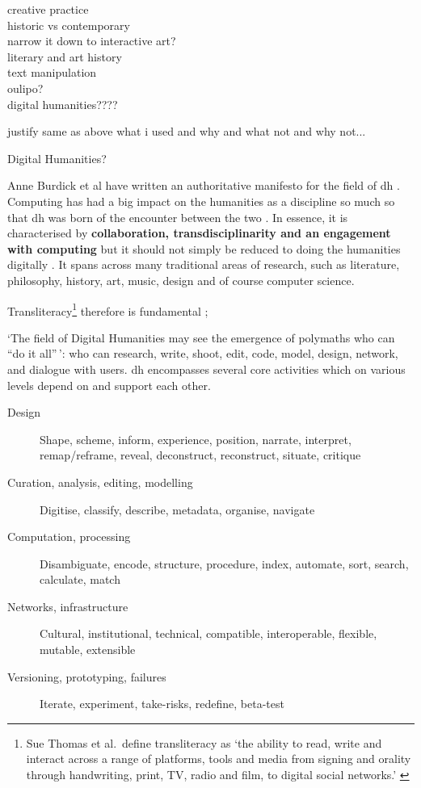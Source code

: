 \begin{draft}
  creative practice\\
  historic vs contemporary\\
  narrow it down to interactive art?\\
  literary and art history\\
  text manipulation\\
  oulipo?\\
  digital humanities????

  justify same as above what i used and why and what not and why not...
\end{draft}

Digital Humanities?

\begin{draft}
  Anne Burdick et al have written an authoritative manifesto for the field of \gls{dh} \citeyear{Burdick2012}. Computing has had a big impact on the humanities as a discipline so much so that \gls{dh} was born of the encounter between the two \autocite[p.3]{Burdick2012}. In essence, it is characterised by \textbf{collaboration, transdisciplinarity and an engagement with computing} \autocite[p.122]{Burdick2012} but it should not simply be reduced to doing the humanities digitally \autocite[p.101]{Burdick2012}. It spans across many traditional areas of research, such as literature, philosophy, history, art, music, design and of course computer science.

  \begin{draft}
    Transliteracy\footnote{Sue Thomas et al.\ define transliteracy as `the ability to read, write and interact across a range of platforms, tools and media from signing and orality through handwriting, print, TV, radio and film, to digital social networks.' \autocite{Thomas2007}} therefore is fundamental \autocite{Thomas2007};
  \end{draft}

  `The field of Digital Humanities may see the emergence of polymaths who can ``do it all''\,': who can research, write, shoot, edit, code, model, design, network, and dialogue with users. \autocite[p.15]{Burdick2012} \gls{dh} encompasses several core activities which on various levels depend on and support each other.

  \begin{description}
    \item [Design] Shape, scheme, inform, experience, position, narrate,
              interpret, remap/reframe, reveal, deconstruct, reconstruct,
              situate, critique
    \item [Curation, analysis, editing, modelling] Digitise, classify, describe, metadata, organise, navigate
    \item [Computation, processing] Disambiguate, encode, structure, procedure, index, automate, sort, search, calculate, match
    \item [Networks, infrastructure] Cultural, institutional, technical, compatible, interoperable, flexible, mutable, extensible
    \item [Versioning, prototyping, failures]	Iterate, experiment, take-risks, redefine, beta-test
  \end{description}


\end{draft}

